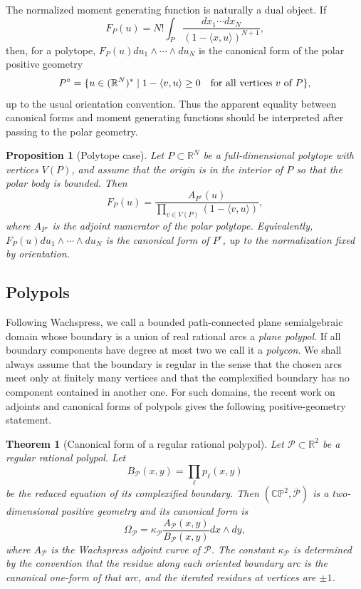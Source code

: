 \documentclass[10pt,a4paper,reqno]{amsart}
\newtheorem{theorem}{Theorem}
\newtheorem{proposition}{Proposition}
\newcommand {\bR} {\mathbb R}
\newcommand {\bCP} {\mathbb {CP}}
\newcommand {\cP} {\mathcal P}
\theoremstyle{plain}
\theoremstyle{definition}
\begin{document}
The normalized moment generating function is naturally a dual object.  If
$$
F_P(u)=N!\int_P\frac{dx_1\cdots dx_N}{(1-\langle x,u\rangle)^{N+1}},
$$
then, for a polytope, $F_P(u)du_1\wedge\cdots\wedge du_N$ is the canonical form of the polar positive geometry
$$
P^\circ=\{u\in(\bR^N)^*\mid 1-\langle v,u\rangle\geq 0\quad\hbox{for all vertices }v\hbox{ of }P\},
$$
up to the usual orientation convention.  Thus the apparent equality between canonical forms and moment generating functions should be interpreted after passing to the polar geometry.

\begin{proposition}[Polytope case]\label{prop:Poly}
Let $P\subset \bR^N$ be a full-dimensional polytope with vertices $V(P)$, and assume that the origin is in the interior of $P$ so that the polar body is bounded.  Then
$$
F_P(u)=\frac{A_{P^\circ}(u)}{\prod_{v\in V(P)}(1-\langle v,u\rangle)},
$$
where $A_{P^\circ}$ is the adjoint numerator of the polar polytope.  Equivalently,
$F_P(u)du_1\wedge\cdots\wedge du_N$ is the canonical form of $P^\circ$, up to the normalization fixed by orientation.
\end{proposition}



\subsection{Polypols} 
Following Wachspress, we call a bounded path-connected plane semialgebraic domain whose boundary is a union of real rational arcs a \emph{plane polypol}.  If all boundary components have degree at most two we call it a \emph{polycon}.  We shall always assume that the boundary is regular in the sense that the chosen arcs meet only at finitely many vertices and that the complexified boundary has no component contained in another one.  For such domains, the recent work on adjoints and canonical forms of polypols gives the following positive-geometry statement.

\begin{theorem}[Canonical form of a regular rational polypol]\label{th:CanForm}
Let $\cP\subset \bR^2$ be a regular rational polypol.  Let
$$
B_{\cP}(x,y)=\prod_\ell p_\ell(x,y)
$$
be the reduced equation of its complexified boundary.  Then $(\bCP^2,\overline{\cP})$ is a two-dimensional positive geometry and its canonical form is
$$
\Omega_{\cP}=\kappa_{\cP}\frac{A_{\cP}(x,y)}{B_{\cP}(x,y)}dx\wedge dy,
$$
where $A_{\cP}$ is the Wachspress adjoint curve of $\cP$.  The constant $\kappa_{\cP}$ is determined by the convention that the residue along each oriented boundary arc is the canonical one-form of that arc, and the iterated residues at vertices are $\pm1$.
\end{theorem}
\end{document}
